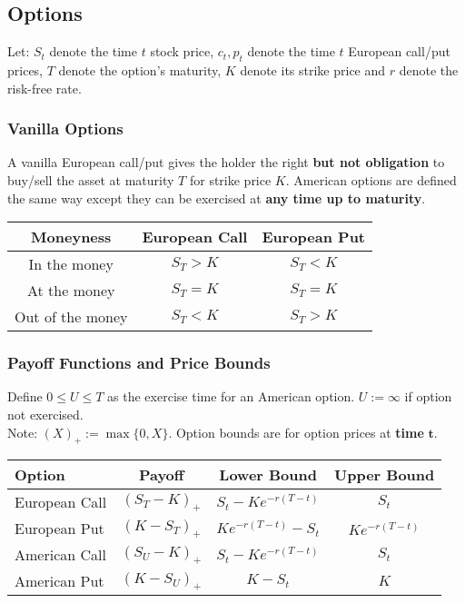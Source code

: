 \documentclass[11pt]{article}
\begin{document}
	\subsection{Options}
	Let: \( S_t \) denote the time \( t \) stock price, \( c_t, p_t \) denote the time \( t \) European call/put prices, \( T \) denote the option's maturity, \( K \) denote its strike price and \( r \) denote the risk-free rate.
	\subsubsection{Vanilla Options}
	A vanilla European call/put gives the holder the right \textbf{but not obligation} to buy/sell the asset at maturity \( T \) for strike price \( K \). American options are defined the same way except they can be exercised at \textbf{any time up to maturity}.
	\begin{center}
		\begin{tabular}{ccc}
			\hline
			\hline
			\textbf{Moneyness} & \textbf{European Call} & \textbf{European Put} \\
			\hline
			In the money & \( S_T > K \) & \( S_T < K \)\\
			\hline
			At the money & \( S_T = K \) & \( S_T = K \)\\
			\hline
			Out of the money &  \( S_T < K \)& \( S_T > K \)\\
			\hline
			\end{tabular}
		\end{center}
	\subsubsection{Payoff Functions and Price Bounds}
	Define \( 0\leq U\leq T \) as the exercise time for an American option. \( U:=\infty \) if option not exercised. \\Note: \( (X)_{+} := \max\{0, X\} \). Option bounds are for option prices at \textbf{time} \( \bm{t} \).
	\begin{center}
		\def\arraystretch{1.25}
		\begin{tabular}{lccc}
			\hline
			\hline
			\textbf{Option} & \textbf{Payoff} & \textbf{Lower Bound} & \textbf{Upper Bound} \\
			\hline
			European Call & \( (S_T - K)_{+} \) & \( S_t - Ke^{-r(T - t)} \) & \( S_t \)\\
			\hline
			European Put & \( (K - S_T)_{+} \) & \( Ke^{-r(T - t)} - S_t \) & \( Ke^{-r(T - t)} \) \\
			\hline
			American Call & \( (S_U - K)_{+} \) & \( S_t - Ke^{-r(T - t)} \) & \( S_t \)\\
			\hline
			American Put & \( (K - S_U)_{+} \) & \( K - S_t \) & \( K \)\\
			\hline
			\end{tabular}
		\end{center}
\end{document}
